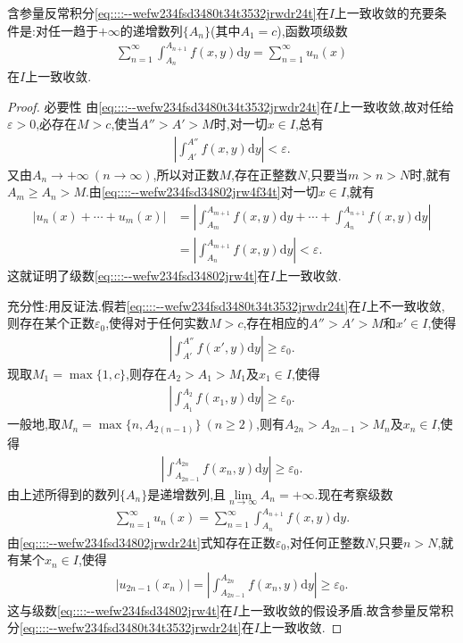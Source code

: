 \documentclass[../../main.tex]{subfiles}
\begin{document}
\begin{theorem}\label{theorem:数学分析--定理19.9}
含参量反常积分\eqref{eq::::--wefw234fsd3480t34t3532jrwdr24t}在$I$上一致收敛的充要条件是:对任一趋于$+\infty$的递增数列$\{A_n\}$(其中$A_1 = c$),函数项级数
\begin{align}
\sum_{n=1}^{\infty} \int_{A_n}^{A_{n+1}} f(x,y)\mathrm{d}y = \sum_{n=1}^{\infty} u_n(x) \label{eq::::--wefw234fsd34802jrw4t}
\end{align}
在$I$上一致收敛.
\end{theorem}
\begin{proof}
{\heiti 必要性} 由\eqref{eq::::--wefw234fsd3480t34t3532jrwdr24t}在$I$上一致收敛,故对任给$\varepsilon > 0$,必存在$M > c$,使当$A'' > A' > M$时,对一切$x \in I$,总有
\begin{align}
\left| \int_{A'}^{A''} f(x,y)\mathrm{d}y \right| < \varepsilon. \label{eq::::--wefw234fsd34802jrw4f34t}
\end{align}
又由$A_n \to +\infty\ (n \to \infty)$,所以对正数$M$,存在正整数$N$,只要当$m > n > N$时,就有$A_m \geqslant A_n > M$.由\eqref{eq::::--wefw234fsd34802jrw4f34t}对一切$x \in I$,就有
\begin{align*}
|u_n(x) + \cdots + u_m(x)| &= \left| \int_{A_m}^{A_{m+1}} f(x,y)\mathrm{d}y + \cdots + \int_{A_n}^{A_{n+1}} f(x,y)\mathrm{d}y \right| \\
&= \left| \int_{A_n}^{A_{m+1}} f(x,y)\mathrm{d}y \right| < \varepsilon.
\end{align*}
这就证明了级数\eqref{eq::::--wefw234fsd34802jrw4t}在$I$上一致收敛.

{\heiti 充分性:}用反证法.假若\eqref{eq::::--wefw234fsd3480t34t3532jrwdr24t}在$I$上不一致收敛,则存在某个正数$\varepsilon_0$,使得对于任何实数$M > c$,存在相应的$A'' > A' > M$和$x' \in I$,使得
\begin{align*}
\left| \int_{A'}^{A''} f(x',y)\mathrm{d}y \right| \geqslant \varepsilon_0.
\end{align*}
现取$M_1 = \max\{1,c\}$,则存在$A_2 > A_1 > M_1$及$x_1 \in I$,使得
\begin{align*}
\left| \int_{A_1}^{A_2} f(x_1,y)\mathrm{d}y \right| \geqslant \varepsilon_0.
\end{align*}
一般地,取$M_n = \max\{n,A_{2(n-1)}\}\ (n \geqslant 2)$,则有$A_{2n} > A_{2n-1} > M_n$及$x_n \in I$,使得
\begin{align}
\left| \int_{A_{2n-1}}^{A_{2n}} f(x_n,y)\mathrm{d}y \right| \geqslant \varepsilon_0. \label{eq::::--wefw234fsd34802jrwdr24t}
\end{align}
由上述所得到的数列$\{A_n\}$是递增数列,且$\lim\limits_{n \to \infty} A_n = +\infty$.现在考察级数
\begin{align*}
\sum_{n=1}^{\infty} u_n(x) = \sum_{n=1}^{\infty} \int_{A_n}^{A_{n+1}} f(x,y)\mathrm{d}y.
\end{align*}
由\eqref{eq::::--wefw234fsd34802jrwdr24t}式知存在正数$\varepsilon_0$,对任何正整数$N$,只要$n > N$,就有某个$x_n \in I$,使得
\begin{align*}
|u_{2n-1}(x_n)| = \left| \int_{A_{2n-1}}^{A_{2n}} f(x_n,y)\mathrm{d}y \right| \geqslant \varepsilon_0.
\end{align*}
这与级数\eqref{eq::::--wefw234fsd34802jrw4t}在$I$上一致收敛的假设矛盾.故含参量反常积分\eqref{eq::::--wefw234fsd3480t34t3532jrwdr24t}在$I$上一致收敛.


\end{proof}
\end{document}
